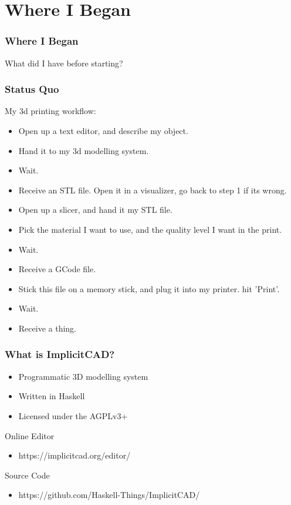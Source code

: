 \documentclass[hyperref={pdfpagemode=FullScreen},aspectratio=169]{beamer}
\begin{document}
\section{Where I Began}

\begin{frame}
  \frametitle{Where I Began}
  \Huge{\centerline{What did I have before starting?}}
\end{frame}

\begin{frame}
  \frametitle{Status Quo}
  My 3d printing workflow:
  \begin{itemize}
  \item Open up a text editor, and describe my object.
  \item Hand it to my 3d modelling system.
  \item Wait.
  \item Receive an STL file. Open it in a visualizer, go back to step 1 if its wrong.
  \item Open up a slicer, and hand it my STL file.
  \item Pick the material I want to use, and the quality level I want in the print.
  \item Wait.
  \item Receive a GCode file.
  \item Stick this file on a memory stick, and plug it into my printer. hit 'Print'.
  \item Wait.
  \item Receive a thing.
  \end{itemize}
\end{frame}

\begin{frame}
  \frametitle{What is ImplicitCAD?}
  \begin{itemize}
  \item Programmatic 3D modelling system
  \item Written in Haskell
  \item Licensed under the AGPLv3+
  \end{itemize}
  \begin{block}{Online Editor}
    \begin{itemize}
    \item https://implicitcad.org/editor/
    \end{itemize}
  \end{block}
  \begin{block}{Source Code}
    \begin{itemize}
    \item https://github.com/Haskell-Things/ImplicitCAD/
    \end{itemize}
  \end{block}
\end{frame}
\end{document}
